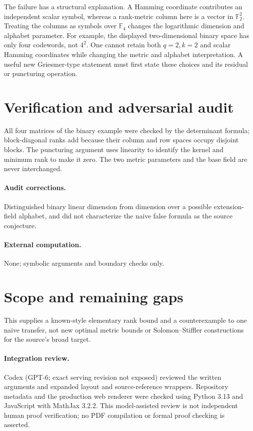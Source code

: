\documentclass[11pt]{article}
\begin{document}
The failure has a structural explanation. A Hamming coordinate contributes an independent scalar symbol, whereas a rank-metric column here is a vector in $\mathbb F_2^2$. Treating the columns as symbols over $\mathbb F_4$ changes the logarithmic dimension and alphabet parameter. For example, the displayed two-dimensional binary space has only four codewords, not $4^2$. One cannot retain both $q=2,k=2$ and scalar Hamming coordinates while changing the metric and alphabet interpretation. A useful new Griesmer-type statement must first state these choices and its residual or puncturing operation.
\section{Verification and adversarial audit}
All four matrices of the binary example were checked by the determinant formula; block-diagonal ranks add because their column and row spaces occupy disjoint blocks. The puncturing argument uses linearity to identify the kernel and minimum rank to make it zero. The two metric parameters and the base field are never interchanged.
\paragraph{Audit corrections.} Distinguished binary linear dimension from dimension over a possible extension-field alphabet, and did not characterize the naive false formula as the source conjecture.
\paragraph{External computation.} None; symbolic arguments and boundary checks only.
\section{Scope and remaining gaps}
This supplies a known-style elementary rank bound and a counterexample to one naive transfer, not new optimal metric bounds or Solomon--Stiffler constructions for the source's broad target.
\paragraph{Integration review.} Codex (GPT-6; exact serving revision not exposed) reviewed the written arguments and expanded layout and source-reference wrappers. Repository metadata and the production web renderer were checked using Python 3.13 and JavaScript with MathJax 3.2.2. This model-assisted review is not independent human proof verification; no PDF compilation or formal proof checking is asserted.
\end{document}
